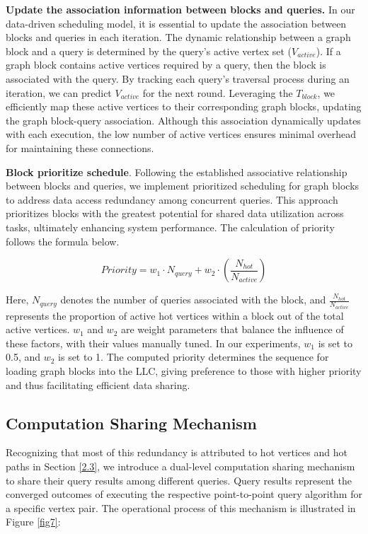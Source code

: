 \documentclass[10pt,journal,compsoc]{IEEEtran}
\begin{document}
{\bf{Update the association information between blocks and queries.}} In our data-driven scheduling model, it is essential to update the association between blocks and queries in each iteration. The dynamic relationship between a graph block and a query is determined by the query's active vertex set ($V_{active}$).
If a graph block contains active vertices required by a query, then the block is associated with the query. By tracking each query's traversal process during an iteration, we can predict $V_{active}$ for the next round. Leveraging the $T_{block}$, we efficiently map these active vertices to their corresponding graph blocks, updating the graph block-query association. Although this association dynamically updates with each execution, the low number of active vertices ensures minimal overhead for maintaining these connections.


{\bf{Block prioritize schedule}}. Following the established associative relationship between blocks and queries, we implement prioritized scheduling for graph blocks to address data access redundancy among concurrent queries. This approach prioritizes blocks with the greatest potential for shared data utilization across tasks, ultimately enhancing system performance. The calculation of priority follows the formula below.

\begin{equation}
{Priority} = w_1 \cdot {N}_{{query}} + w_2 \cdot \left(\frac{{N}_{{hot}}}{{N}_{{active}}}\right)
\end{equation}


Here, ${N}_{{query}}$ denotes the number of queries associated with the block, and $\frac{{N}_{{hot}}}{{N}_{{active}}}$ represents the proportion of active hot vertices within a block out of the total active vertices. $w_1$ and $w_2$ are weight parameters that balance the influence of these factors, with their values manually tuned. 
In our experiments, $w_1$ is set to 0.5, and $w_2$ is set to 1.
The computed priority determines the sequence for loading graph blocks into the LLC, giving preference to those with higher priority and thus facilitating efficient data sharing.

\vspace{-6pt}
\subsection{Computation Sharing Mechanism}\label{3.3}
Recognizing that most of this redundancy is attributed to hot vertices and hot paths in Section \ref{2.3}, we introduce a dual-level computation sharing mechanism to share their query results among different queries. Query results represent the converged outcomes of executing the respective point-to-point query algorithm for a specific vertex pair.
The operational process of this mechanism is illustrated in Figure \ref{fig7}:
\end{document}
